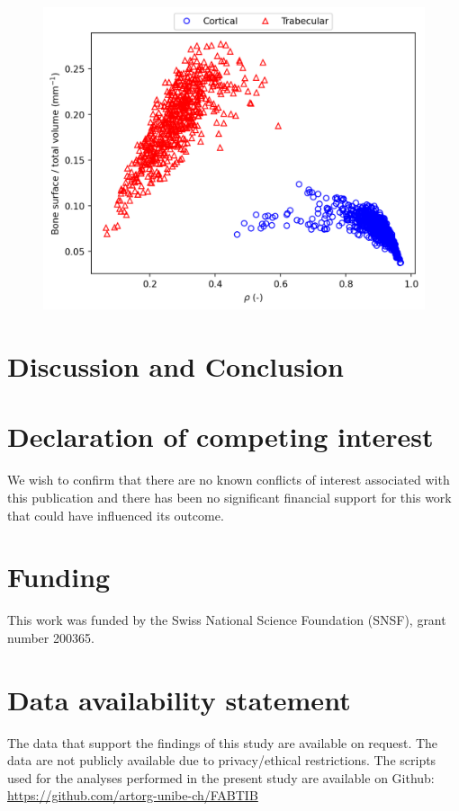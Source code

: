 \documentclass[a4paper,fleqn]{DC_ArtStyle}
\begin{document}
	\begin{figure}
		\includegraphics[width=\linewidth]{RhoVsBS}
	\end{figure}
	
	
	\section{Discussion and Conclusion}
	
	
	\section*{Declaration of competing interest}
	We wish to confirm that there are no known conflicts of interest associated with this publication and there has been no significant financial support for this work that could have influenced its outcome.
	
	\section*{Funding}
	This work was funded by the Swiss National Science Foundation (SNSF), grant number 200365.

	\section*{Data availability statement}
	The data that support the findings of this study are available on request. The data are not publicly available due to privacy/ethical restrictions. The scripts used for the analyses performed in the present study are available on Github: \url{https://github.com/artorg-unibe-ch/FABTIB}
	
\end{document}
